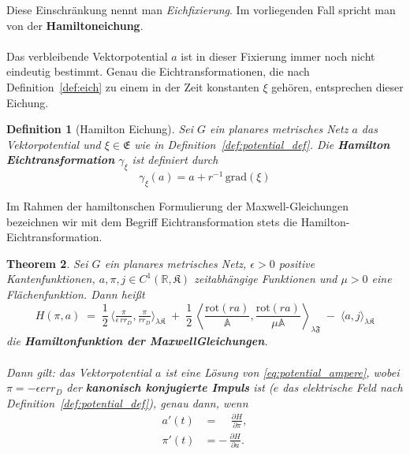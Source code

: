 \documentclass[11pt,a4paper,leqno]{report}
\newtheorem{theorem}{Theorem}[chapter]
\newtheorem{definition}[theorem]{Definition}
\numberwithin{equation}{chapter}
\begin{document}
Diese Einschränkung nennt man \emph{Eichfixierung}. 
Im vorliegenden Fall spricht man von der \textbf{Hamiltoneichung}.  \\
\\
Das verbleibende Vektorpotential \(a\) ist in dieser Fixierung 
immer noch nicht eindeutig bestimmt. 
Genau die Eichtransformationen, die nach Definition~\ref{def:eich} 
zu einem in der Zeit konstanten \(\xi\) gehören, entsprechen dieser Eichung. 
\begin{definition}[Hamilton Eichung]
	Sei \(G\) ein planares metrisches Netz \( a\) das Vektorpotential und \(\xi \in \mathfrak{E}\) wie in Definition~\ref{def:potential_def}.  
	Die \textbf{Hamilton Eichtransformation} \(\gamma_\xi\) ist definiert durch
	\begin{equation}
		\gamma_\xi (a)
		=  a + r^{-1}\, \mathrm{grad}(\xi) 
	\end{equation}
\end{definition}
\noindent
Im Rahmen der hamiltonschen Formulierung der Maxwell-Gleichungen bezeichnen wir mit dem Begriff Eichtransformation stets die Hamilton- Eichtransformation.
\begin{theorem} \label{thm:hamiltongl}
	Sei \( G \) ein planares metrisches Netz, \(\epsilon>0\) positive Kantenfunktionen, 
	\( a,\pi,j \in C^{1}(\mathbb{R}, \mathfrak{K}) \) zeitabhängige Funktionen 
	und \(\mu > 0 \) eine Flächenfunktion.  
	Dann heißt 
	\begin{equation}\label{eq:Hamilton}
		H(\pi, a) \;=\; 
		\frac{1}{2}\,\langle \tfrac{\pi}{\epsilon\,rr_D}, \tfrac{\pi}{rr_D} \rangle_{\lambda\mathfrak{K}}
		\;+\; \frac{1}{2}\,\left\langle \frac{\mathrm{rot}(r a)}{\mathbb{A}}, 
		\frac{\mathrm{rot}(r a)}{\mu\mathbb{A}} \right\rangle_{\lambda\mathfrak{F}}
		\;-\; \langle a, j \rangle_{\lambda\mathfrak{K}}
	\end{equation}
	die \textbf{Hamiltonfunktion der Maxwell\-Gleichungen}. \\
	\\
	Dann gilt: 
	das Vektorpotential \(a\) ist eine Lösung von \eqref{eq:potential_ampere}, 
	wobei \(\pi = - \epsilon err_D\) der \textbf{kanonisch konjugierte Impuls} ist 
	(\(e\) das elektrische Feld nach Definition~\ref{def:potential_def}), 
	genau dann, wenn
	\begin{align}
		a'(t) &= \;\;\;\;\frac{\partial H}{\partial \pi},\label{thm:hamil_eq1} \\[4pt]
		\pi'(t) &= -\,\frac{\partial H}{\partial a}.\label{thm:hamil_eq2}
	\end{align}
\end{theorem}
\end{document}
